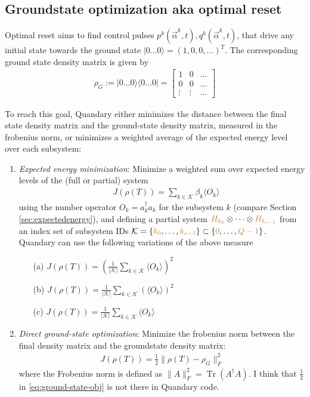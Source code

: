 \documentclass[letterpaper]{article}
\newcommand{\YC}[1]{{\textcolor{Bronze}{#1}}}
\DeclareMathOperator{\Tr}{Tr}
\begin{document}
\subsection{Groundstate optimization aka optimal
reset}\label{sec:groundstate-obj}
Optimal reset aims to find control pulses $p^k(\vec{\alpha}^k, t), q^k(\vec{\alpha}^k, t)$,
that drive any initial state towards the ground state $|0\dots 0\rangle = (1, 0,
0, \dots )^T$. The corresponding ground state density matrix is given by
\begin{align}
  \rho_{G} := |0\dots 0\rangle \langle 0 \dots 0 | = 
  \begin{bmatrix} 1      & 0      &  \dots   \\ 
                  0      & 0      &  \dots  \\ 
                  \vdots & \vdots &  \dots 
  \end{bmatrix}
\end{align}

To reach this goal, Quandary either minimizes the distance between the final state
density matrix and the ground-state density matrix, measured in the frobenius
norm, or minimizes a weighted average of the expected energy level over each subsystem:
\begin{enumerate}
  \item \textit{Expected energy minimization}: Minimize a weighted sum over
    expected energy levels of the (full or partial) system
    \begin{align}
       \quad J(\rho(T)) = \sum_{k\in \mathcal{K}} \beta_k \langle O_k \rangle 
    \end{align}
    using the number operator $O_k = a_k^\dag a_k$ for the subsystem $k$
    (compare Section \ref{sec:expectedenergy}), and defining a partial system
    $\YC{H_{k_0}}\otimes \dots \otimes \YC{H_{k_{s-1}}}$ from an index set of
    subsystem IDs $\mathcal{K}=\{\YC{k_0},\dots,\YC{k_{s-1}}\}\subset
    \{\YC{0},\dots,\YC{Q-1}\}$. Quandary can use the following variations of the
    above measure
    \begin{enumerate}
      \item[(a)] $J(\rho(T)) =
        \left(\frac{1}{|\mathcal{K}|}\sum_{k\in\mathcal{K}}\langle O_k \rangle
        \right)^2$
      \item[(b)] $J(\rho(T)) =
        \frac{1}{|\mathcal{K}|}\sum_{k\in\mathcal{K}}\left(\langle O_k \rangle
        \right)^2 $
      \item[(c)] $J(\rho(T)) =
        \frac{1}{|\mathcal{K}|}\sum_{k\in\mathcal{K}}\langle O_k \rangle$
    \end{enumerate}
  \item \textit{Direct ground-state optimization}: Minimize the frobenius norm
    between the final density matrix and the groundstate density matrix:
    \begin{align}\label{eq:ground-state-obj}
      J(\rho(T)) = \frac 12 \| \rho(T) - \rho_G \|^2_F 
    \end{align}
    where the Frobenius norm is defined as $\|A\|^2_F = \Tr(A^{\dagger}A)$.
    \YC{I think that $\frac 12$ in \eqref{eq:ground-state-obj} is not there in
    Quandary code.}
\end{enumerate}
\end{document}
